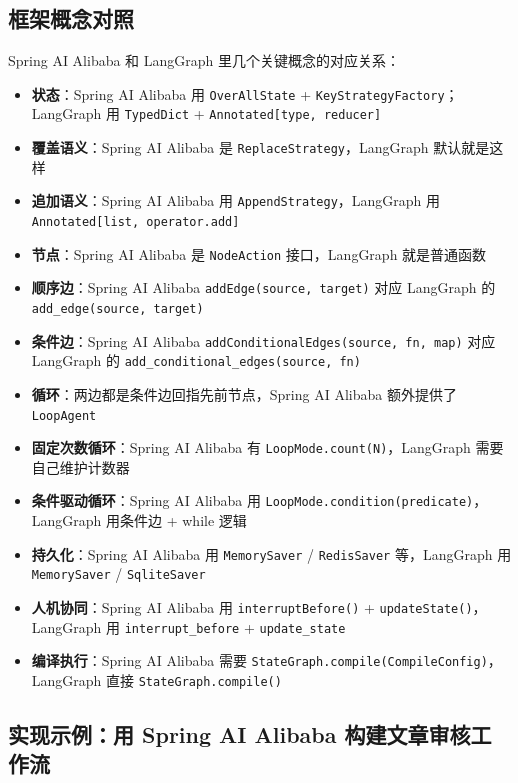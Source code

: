 \documentclass[10pt,a4paper]{ctexart}
\begin{document}
\subsection{框架概念对照}


Spring AI Alibaba 和 LangGraph 里几个关键概念的对应关系：


\begin{itemize}[itemsep=2pt, topsep=4pt]
  \item \textbf{状态}：Spring AI Alibaba 用 \texttt{OverAllState} + \texttt{KeyStrategyFactory}；LangGraph 用 \texttt{TypedDict} + \texttt{Annotated[type, reducer]}
  \item \textbf{覆盖语义}：Spring AI Alibaba 是 \texttt{ReplaceStrategy}，LangGraph 默认就是这样
  \item \textbf{追加语义}：Spring AI Alibaba 用 \texttt{AppendStrategy}，LangGraph 用 \texttt{Annotated[list, operator.add]}
  \item \textbf{节点}：Spring AI Alibaba 是 \texttt{NodeAction} 接口，LangGraph 就是普通函数
  \item \textbf{顺序边}：Spring AI Alibaba \texttt{addEdge(source, target)} 对应 LangGraph 的 \texttt{add\_edge(source, target)}
  \item \textbf{条件边}：Spring AI Alibaba \texttt{addConditionalEdges(source, fn, map)} 对应 LangGraph 的 \texttt{add\_conditional\_edges(source, fn)}
  \item \textbf{循环}：两边都是条件边回指先前节点，Spring AI Alibaba 额外提供了 \texttt{LoopAgent}
  \item \textbf{固定次数循环}：Spring AI Alibaba 有 \texttt{LoopMode.count(N)}，LangGraph 需要自己维护计数器
  \item \textbf{条件驱动循环}：Spring AI Alibaba 用 \texttt{LoopMode.condition(predicate)}，LangGraph 用条件边 + while 逻辑
  \item \textbf{持久化}：Spring AI Alibaba 用 \texttt{MemorySaver} / \texttt{RedisSaver} 等，LangGraph 用 \texttt{MemorySaver} / \texttt{SqliteSaver}
  \item \textbf{人机协同}：Spring AI Alibaba 用 \texttt{interruptBefore()} + \texttt{updateState()}，LangGraph 用 \texttt{interrupt\_before} + \texttt{update\_state}
  \item \textbf{编译执行}：Spring AI Alibaba 需要 \texttt{StateGraph.compile(CompileConfig)}，LangGraph 直接 \texttt{StateGraph.compile()}
\end{itemize}


\subsection{实现示例：用 Spring AI Alibaba 构建文章审核工作流}
\end{document}
